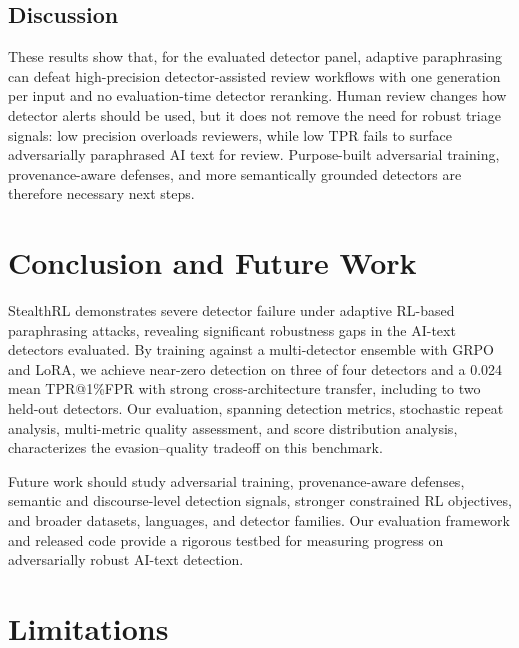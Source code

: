 \documentclass[11pt]{article}
\begin{document}
\subsection{Discussion}

These results show that, for the evaluated detector panel, adaptive paraphrasing can defeat high-precision detector-assisted review workflows with one generation per input and no evaluation-time detector reranking. Human review changes how detector alerts should be used, but it does not remove the need for robust triage signals: low precision overloads reviewers, while low TPR fails to surface adversarially paraphrased AI text for review. Purpose-built adversarial training, provenance-aware defenses, and more semantically grounded detectors are therefore necessary next steps.

\section{Conclusion and Future Work}
\label{sec:conclusion}

StealthRL demonstrates severe detector failure under adaptive RL-based paraphrasing attacks, revealing significant robustness gaps in the AI-text detectors evaluated. By training against a multi-detector ensemble with GRPO and LoRA, we achieve near-zero detection on three of four detectors and a 0.024 mean TPR@1\%FPR with strong cross-architecture transfer, including to two held-out detectors. Our evaluation, spanning detection metrics, stochastic repeat analysis, multi-metric quality assessment, and score distribution analysis, characterizes the evasion--quality tradeoff on this benchmark.

Future work should study adversarial training, provenance-aware defenses, semantic and discourse-level detection signals, stronger constrained RL objectives, and broader datasets, languages, and detector families. Our evaluation framework and released code provide a rigorous testbed for measuring progress on adversarially robust AI-text detection.

\section{Limitations}
\label{sec:limitations}
\end{document}
